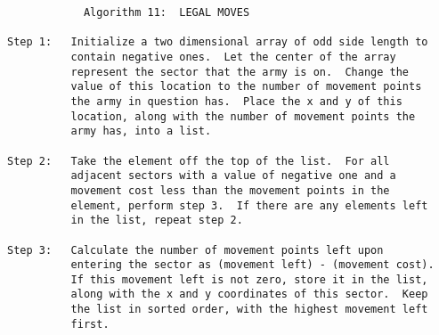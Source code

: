 \begin{verbatim}
		    Algorithm 11:  LEGAL MOVES

Step 1:   Initialize a two dimensional array of odd side length to
          contain negative ones.  Let the center of the array
          represent the sector that the army is on.  Change the
          value of this location to the number of movement points
          the army in question has.  Place the x and y of this
          location, along with the number of movement points the
          army has, into a list.

Step 2:   Take the element off the top of the list.  For all
          adjacent sectors with a value of negative one and a
          movement cost less than the movement points in the
          element, perform step 3.  If there are any elements left
          in the list, repeat step 2.

Step 3:   Calculate the number of movement points left upon
          entering the sector as (movement left) - (movement cost). 
          If this movement left is not zero, store it in the list,
          along with the x and y coordinates of this sector.  Keep
          the list in sorted order, with the highest movement left
          first.

\end{verbatim}


